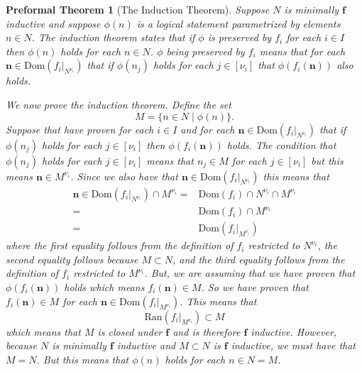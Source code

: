 \documentclass[oneside, 12pt]{book}
\theoremstyle{break}
\newtheorem{preformal definition}[definition]{Preformal Definition}
\newtheorem{preformal theorem}[theorem]{Preformal Theorem}
\newcommand{\bv}[1]{\boldsymbol{#1}}
\begin{document}
				\begin{preformal theorem}[The Induction Theorem]
					\label{thm:inductiontheorem}					
					Suppose $N$ is minimally $\bv{f}$ inductive and suppose $\phi(n)$ is a logical statement parametrized by elements $n\in N$.
					The induction theorem states that if $\phi$ is preserved by $f_i$ for each $i\in I$ then $\phi(n)$ holds for each $n\in N$.
					$\phi$ being preserved by $f_i$ means that for each $\bv{n} \in \text{Dom}(f_i|_{N^{\nu_i}})$ that if $\phi(n_j)$ holds for each $j\in [\nu_i]$ that $\phi(f_i(\bv{n}))$ also holds.
					
					We now prove the induction theorem.
					Define the set
					\begin{equation*}
						M = \{n\in N \mid \phi(n)\}.
					\end{equation*}
					Suppose that have proven for each $i\in I$ and for each $\bv{n} \in \text{Dom}(f_i|_{N^{\nu_i}})$ that if $\phi(n_j)$ holds for each $j\in [\nu_i]$ then $\phi(f_i(\bv{n}))$ holds.
					The condition that $\phi(n_j)$ holds for each $j\in [\nu_i]$ means that $n_j \in M$ for each $j\in [\nu_i]$ but this means $\bv{n} \in M^{\nu_i}$.
					Since we also have that $\bv{n} \in \text{Dom}(f_i|_{N^{\nu_i}})$ this means that 
					\begin{align*}
						\bv{n} \in \text{Dom}(f_i|_{N^{\nu_i}}) \cap M^{\nu_i} =& \text{Dom}(f_i) \cap N^{\nu_i} \cap M^{\nu_i}\\
						=& \text{Dom}(f_i) \cap M^{\nu_i}\\
						=& \text{Dom}(f_i|_{M^{\nu_i}})
					\end{align*}
					where the first equality follows from the definition of $f_i$ restricted to $N^{\nu_i}$, the second equality follows because $M\subset N$, and the third equality follows from the definition of $f_i$ restricted to $M^{\nu_i}$.
					But, we are assuming that we have proven that $\phi(f_i(\bv{n}))$ holds which means $f_i(\bv{n}) \in M$.
					So we have proven that $f_i(\bv{n}) \in M$ for each $\bv{n} \in \text{Dom}(f_i|_{M^{\nu_i}})$.
					This means that
					\begin{equation*}
						\text{Ran}(f_i|_{M^{\nu_i}}) \subset M
					\end{equation*}
					which means that $M$ is closed under $\bv{f}$ and is therefore $\bv{f}$ inductive.
					However, because $N$ is \textit{minimally} $\bv{f}$ inductive and $M\subset N$ is $\bv{f}$ inductive, we must have that $M=N$.
					But this means that $\phi(n)$ holds for each $n\in N=M$.	
				\end{preformal theorem}
				
\end{document}
